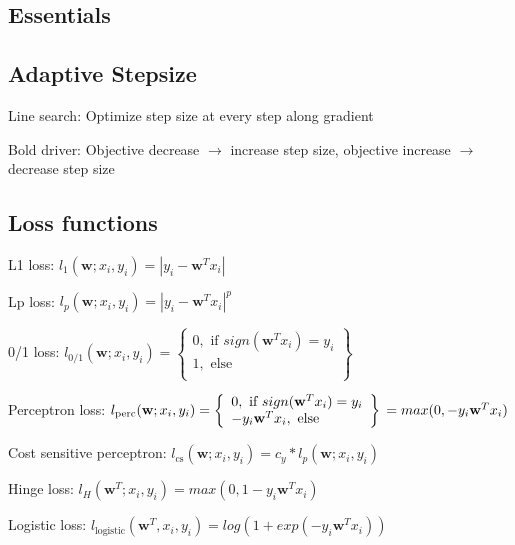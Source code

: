\documentclass[a4paper, 11pt, landscape]{article}
\begin{document}
	\begin{multicols*}{3}
		
		\section{Essentials}
		\subsection{Adaptive Stepsize}
		\begin{compactdesc}
			\item[Line search:] Optimize step size at every step along gradient
			\item[Bold driver:] Objective decrease $\rightarrow$ increase step size, objective increase  $\rightarrow$ decrease step size
		\end{compactdesc}
		\subsection{Loss functions}
		\begin{compactdesc}
			\item[L1 loss:] $l_1(\mathbf{w}; x_i, y_i) = |y_i - \mathbf{w}^T x_i| $ 
			\item[Lp loss:] $l_p(\mathbf{w}; x_i, y_i) = |y_i - \mathbf{w}^T x_i|^p$
			\item[0/1 loss:] $l_{0/1}(\mathbf{w}; x_i, y_i) =  \left\{
			\begin{array}{lr}
			0, \text{ if } sign(\mathbf{w}^Tx_i) = y_i\\
			1, \text{ else}\\
			\end{array}\right\}$
			\item[Perceptron loss:] $l_\text{perc}(\mathbf{w}; x_i, y_i) = \left\{
			\begin{array}{lr}
			0, \text{ if } sign(\mathbf{w}^Tx_i) = y_i\\
			-y_i\mathbf{w}^Tx_i, \text{ else}\\
			\end{array}\right\}\\ = max(0, -y_i \mathbf{w}^T x_i)$
			\item[Cost sensitive perceptron:] $l_\text{cs}(\mathbf{w}; x_i, y_i) = c_y * l_p(\mathbf{w}; x_i, y_i)$
			\item[Hinge loss:] $l_H(\mathbf{w}^T; x_i, y_i) = max(0, 1- y_i \mathbf{w}^Tx_i)$
			\item[Logistic loss:] $l_\text{logistic}(\mathbf{w}^T, x_i, y_i) = log(1 + exp(-y_i\mathbf{w}^Tx_i))$
		\end{compactdesc}

\end{multicols*}
\end{document}

